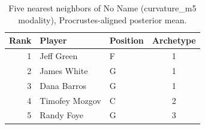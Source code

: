 \begin{table}[htbp]
  \centering\small
  \begin{tabular}{rllc}
    \toprule
    Rank & Player & Position & Archetype \\
    \midrule
    1 & Jeff Green & F & 1 \\
    2 & James White & G & 1 \\
    3 & Dana Barros & G & 1 \\
    4 & Timofey Mozgov & C & 2 \\
    5 & Randy Foye & G & 3 \\
    \bottomrule
  \end{tabular}
  \caption{Five nearest neighbors of No Name (curvature_m5 modality), Procrustes-aligned posterior mean.}
  \label{tab:No_Name_neighbors_curvature_m5}
\end{table}

